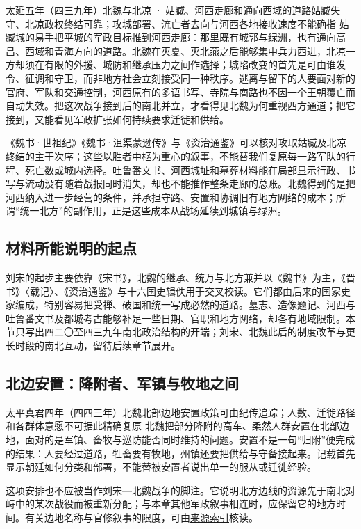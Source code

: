 \begin{event}{}{太延五年（四三九年）}{北魏与北凉 · 姑臧、河西走廊和通向西域的道路}{姑臧失守、北凉政权终结可靠；攻城部署、流亡者去向与河西各地接收速度不能确指}
姑臧城的易手把平城的军政目标推到河西走廊：那里既有城郭与绿洲，也有通向高昌、西域和青海方向的道路。北魏在灭夏、灭北燕之后能够集中兵力西进，北凉一方却须在有限的外援、城防和继承压力之间作选择；城陷改变的首先是可由谁发令、征调和守卫，而非地方社会立刻接受同一种秩序。逃离与留下的人要面对新的官府、军队和交通控制，河西原有的多语书写、寺院与商路也不因一个王朝覆亡而自动失效。把这次战争接到后的南北并立，才看得见北魏为何重视西方通道；把它接到，又能看见军政扩张如何持续要求迁徙和供给。

《魏书·世祖纪》《魏书·沮渠蒙逊传》与《资治通鉴》可以核对攻取姑臧及北凉终结的主干次序；这些以胜者中枢为重心的叙事，不能替我们复原每一路军队的行程、死亡数或城内选择。吐鲁番文书、河西城址和墓葬材料能在局部显示行政、书写与流动没有随着战报同时消失，却也不能推作整条走廊的总账。北魏得到的是把河西纳入进一步经营的条件，并承担守路、安置和协调旧有地方网络的成本；所谓“统一北方”的副作用，正是这些成本从战场延续到城镇与绿洲。
\end{event}

\subsection{材料所能说明的起点}

刘宋的起步主要依靠《宋书》，北魏的继承、统万与北方兼并以《魏书》为主，《晋书》〈载记〉、《资治通鉴》与十六国史辑佚用于交叉校读。它们都由后来的国家史家编成，特别容易把受禅、破国和统一写成必然的道路。墓志、造像题记、河西与吐鲁番文书及都城考古能够补足一些日期、官职和地方网络，却各有地域限制。本节只写出四二〇至四三九年南北政治结构的开端；刘宋、北魏此后的制度改革与更长时段的南北互动，留待后续章节展开。

\subsection{北边安置：降附者、军镇与牧地之间}
\begin{event}{}{太平真君四年（四四三年）}{北魏北部边地}{安置政策可由纪传追踪；人数、迁徙路径和各群体意愿不可据此精确复原}
北魏把部分降附的高车、柔然人群安置在北部边地，面对的是军镇、畜牧与巡防能否同时维持的问题。安置不是一句“归附”便完成的结果：人要经过道路，牲畜要有牧地，州镇还要把供给与守备接起来。记载首先显示朝廷如何分类和部署，不能替被安置者说出单一的服从或迁徙经验。

这项安排也不应被当作刘宋—北魏战争的脚注。它说明北方边线的资源先于南北对峙中的某次战役而被重新分配；与本章其他军政叙事相连时，应保留它的地方时间。有关边地名称与官修叙事的限度，可由\hyperref[app:sources]{来源索引}核读。
\end{event}

